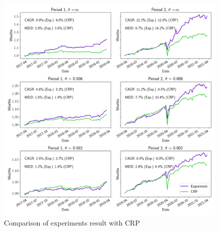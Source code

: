 \begin{figure}[htb]
\centering
  \includegraphics[width=16cm]{images/crp_compare.png}
  \caption [Comparison of experiments result with CRP]{Comparison of experiments result with CRP}
  \label{fig:crp_compare}
\end{figure}